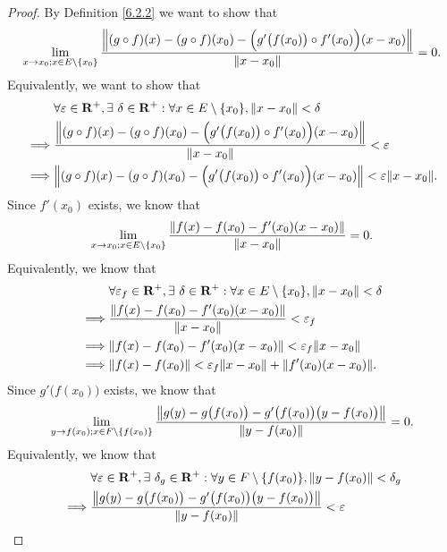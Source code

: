 \begin{proof}
    By Definition \ref{6.2.2} we want to show that
    \[
        \lim_{x \to x_0 ; x \in E \setminus \{x_0\}} \frac{\norm*{(g \circ f)(x) - (g \circ f)(x_0) - \Big(g'\big(f(x_0)\big) \circ f'(x_0)\Big)(x - x_0)}}{\norm*{x - x_0}} = 0.
    \]
    Equivalently, we want to show that
    \begin{align*}
                 & \forall \varepsilon \in \mathbf{R}^+, \exists\ \delta \in \mathbf{R}^+ : \forall x \in E \setminus \{x_0\}, \norm*{x - x_0} < \delta  \\
        \implies & \frac{\norm*{(g \circ f)(x) - (g \circ f)(x_0) - \Big(g'\big(f(x_0)\big) \circ f'(x_0)\Big)(x - x_0)}}{\norm*{x - x_0}} < \varepsilon \\
        \implies & \norm*{(g \circ f)(x) - (g \circ f)(x_0) - \Big(g'\big(f(x_0)\big) \circ f'(x_0)\Big)(x - x_0)} < \varepsilon \norm*{x - x_0}.
    \end{align*}
    Since \(f'(x_0)\) exists, we know that
    \[
        \lim_{x \to x_0 ; x \in E \setminus \{x_0\}} \frac{\norm*{f(x) - f(x_0) - f'(x_0)(x - x_0)}}{\norm*{x - x_0}} = 0.
    \]
    Equivalently, we know that
    \begin{align*}
                 & \forall \varepsilon_f \in \mathbf{R}^+, \exists\ \delta \in \mathbf{R}^+ : \forall x \in E \setminus \{x_0\}, \norm*{x - x_0} < \delta \\
        \implies & \frac{\norm*{f(x) - f(x_0) - f'(x_0)(x - x_0)}}{\norm*{x - x_0}} < \varepsilon_f                                                       \\
        \implies & \norm*{f(x) - f(x_0) - f'(x_0)(x - x_0)} < \varepsilon_f \norm*{x - x_0}                                                               \\
        \implies & \norm*{f(x) - f(x_0)} < \varepsilon_f \norm*{x - x_0} + \norm*{f'(x_0)(x - x_0)}.
    \end{align*}
    Since \(g'\big(f(x_0)\big)\) exists, we know that
    \[
        \lim_{y \to f(x_0) ; x \in F \setminus \{f(x_0)\}} \frac{\norm*{g(y) - g\big(f(x_0)\big) - g'\big(f(x_0)\big)\big(y - f(x_0)\big)}}{\norm*{y - f(x_0)}} = 0.
    \]
    Equivalently, we know that
    \begin{align*}
                 & \forall \varepsilon \in \mathbf{R}^+, \exists\ \delta_g \in \mathbf{R}^+ : \forall y \in F \setminus \{f(x_0)\}, \norm*{y - f(x_0)} < \delta_g \\
        \implies & \frac{\norm*{g(y) - g\big(f(x_0)\big) - g'\big(f(x_0)\big)\big(y - f(x_0)\big)}}{\norm*{y - f(x_0)}} < \varepsilon                             \\

\end{align*}
\end{proof}
